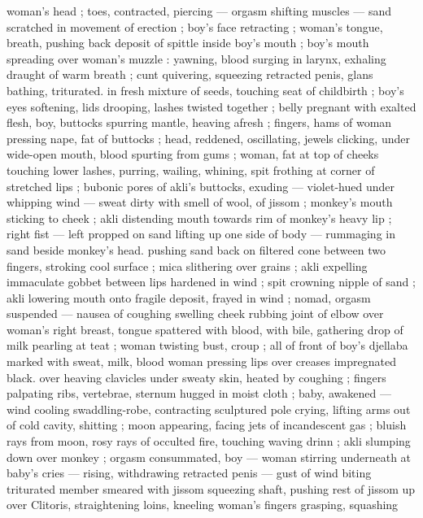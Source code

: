 woman's head ; toes, contracted, piercing --- orgasm shifting 
muscles --- sand scratched in movement of erection ; boy's face 
retracting ; woman's tongue, breath, pushing back deposit of spittle 
inside boy's mouth ; boy's mouth spreading over woman's muzzle : 
yawning, blood surging in larynx, exhaling draught of warm breath ; 
cunt quivering, squeezing retracted penis, glans bathing, triturated. 
in fresh mixture of seeds, touching seat of childbirth ; boy's eyes 
softening, lids drooping, lashes twisted together ; belly pregnant with 
exalted flesh, boy, buttocks spurring mantle, heaving afresh ; fingers, 
hams of woman pressing nape, fat of buttocks ; head, reddened, 
oscillating, jewels clicking, under wide-open mouth, blood spurting 
from gums ; woman, fat at top of cheeks touching lower lashes, 
purring, wailing, whining, spit frothing at corner of stretched lips ; 
bubonic pores of akli's buttocks, exuding --- violet-hued under 
whipping wind --- sweat dirty with smell of wool, of jissom ; 
monkey's mouth sticking to cheek ; akli distending mouth towards 
rim of monkey's heavy lip ; right fist --- left propped on sand lifting 
up one side of body --- rummaging in sand beside monkey's head. 
pushing sand back on filtered cone between two fingers, stroking 
cool surface ; mica slithering over grains ; akli expelling immaculate 
gobbet between lips hardened in wind ; spit crowning nipple of sand 
; akli lowering mouth onto fragile deposit, frayed in wind ; nomad, 
orgasm suspended --- nausea of coughing swelling cheek {\dashcom}
rubbing joint of elbow over woman's right breast, tongue spattered 
with blood, with bile, gathering drop of milk pearling at teat ; woman 
twisting bust, croup ; all of front of boy's djellaba marked with sweat, 
milk, blood {\col} woman pressing lips over creases impregnated black. 
over heaving clavicles under sweaty skin, heated by coughing ; 
fingers palpating ribs, vertebrae, sternum hugged in moist cloth ; 
baby, awakened --- wind cooling swaddling-robe, contracting 
sculptured pole {\dashcom} crying, lifting arms out of cold cavity, shitting ; 
moon appearing, facing jets of incandescent gas ; bluish rays from 
moon, rosy rays of occulted fire, touching waving drinn ; akli 
slumping down over monkey ; orgasm consummated, boy --- woman 
stirring underneath at baby's cries --- rising, withdrawing retracted 
penis --- gust of wind biting triturated member smeared with jissom 
{\dashcom} squeezing shaft, pushing rest of jissom up over Clitoris, 
straightening loins, kneeling woman's fingers grasping, squashing 
